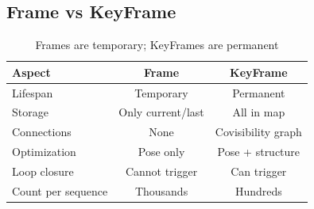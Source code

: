 \subsection{Frame vs KeyFrame}

\begin{table}[H]
\centering
\begin{tabular}{@{}lcc@{}}
\toprule
\textbf{Aspect} & \textbf{Frame} & \textbf{KeyFrame} \\
\midrule
Lifespan & Temporary & Permanent \\
Storage & Only current/last & All in map \\
Connections & None & Covisibility graph \\
Optimization & Pose only & Pose + structure \\
Loop closure & Cannot trigger & Can trigger \\
Count per sequence & Thousands & Hundreds \\
\bottomrule
\end{tabular}
\caption{Frames are temporary; KeyFrames are permanent}
\end{table}
